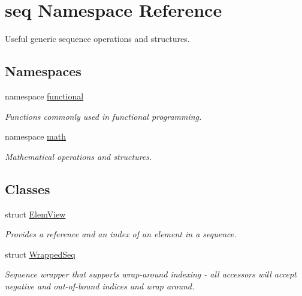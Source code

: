 \hypertarget{namespaceseq}{\section{seq Namespace Reference}
\label{namespaceseq}
}


Useful generic sequence operations and structures.  


\subsection*{Namespaces}
\begin{DoxyCompactItemize}
\item 
namespace \hyperlink{namespaceseq_1_1functional}{functional}
\begin{DoxyCompactList}\small\item\em Functions commonly used in functional programming. \end{DoxyCompactList}\item 
namespace \hyperlink{namespaceseq_1_1math}{math}
\begin{DoxyCompactList}\small\item\em Mathematical operations and structures. \end{DoxyCompactList}\end{DoxyCompactItemize}
\subsection*{Classes}
\begin{DoxyCompactItemize}
\item 
struct \hyperlink{structseq_1_1_elem_view}{Elem\-View}
\begin{DoxyCompactList}\small\item\em Provides a reference and an index of an element in a sequence. \end{DoxyCompactList}\item 
struct \hyperlink{structseq_1_1_wrapped_seq}{Wrapped\-Seq}
\begin{DoxyCompactList}\small\item\em Sequence wrapper that supports wrap-\/around indexing -\/ all accessors will accept negative and out-\/of-\/bound indices and wrap around. \end{DoxyCompactList}\end{DoxyCompactItemize}
